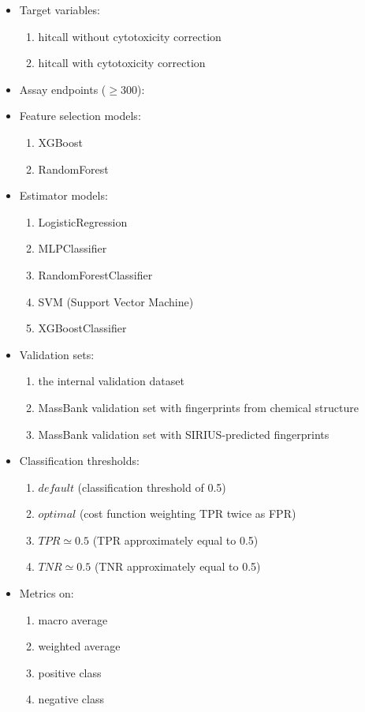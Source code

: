 \begin{itemize}
  \item Target variables:
  \begin{enumerate}
    \item hitcall without cytotoxicity correction
    \item hitcall with cytotoxicity correction
  \end{enumerate}
  \item Assay endpoints ($\geq 300$):
  \item Feature selection models:
    \begin{enumerate}
      \item XGBoost
      \item RandomForest
    \end{enumerate}
    \item Estimator models:
    \begin{enumerate}
      \item LogisticRegression
      \item MLPClassifier
      \item RandomForestClassifier
      \item SVM (Support Vector Machine)
      \item XGBoostClassifier
    \end{enumerate}
  \item Validation sets:
    \begin{enumerate}
      \item the internal validation dataset 
      \item MassBank validation set with fingerprints from chemical structure
      \item MassBank validation set with SIRIUS-predicted fingerprints
    \end{enumerate}
  \item Classification thresholds:
    \begin{enumerate}
      \item $default$  (classification threshold of 0.5)
      \item $optimal$ (cost function weighting TPR twice as FPR)
      \item $TPR \simeq 0.5$ (TPR approximately equal to 0.5)
      \item $TNR \simeq 0.5$ (TNR approximately equal to 0.5)
    \end{enumerate}
  \item Metrics on:
    \begin{enumerate}
      \item macro average
      \item weighted average
      \item positive class
      \item negative class
    \end{enumerate}
\end{itemize}


